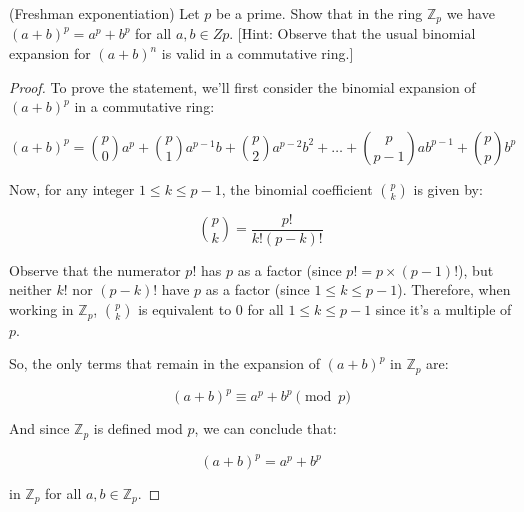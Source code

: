 \documentclass[12pt]{amsart}
\theoremstyle{definition}
\numberwithin{equation}{section}
\theoremstyle{plain}
\newcommand{\Z}{\mathbb{Z}}
\begin{document}
\begin{exercise}{41}
    (Freshman exponentiation) Let $p$ be a prime. Show that in the ring $\Z_p$ we have $(a + b)^p = a^p + b^p$ for all
$a, b \in Zp$. [Hint: Observe that the usual binomial expansion for $(a + b)^n$ is valid in a commutative ring.]
    \begin{proof}
        To prove the statement, we'll first consider the binomial expansion of \( (a + b)^p \) in a commutative ring:

\[
(a + b)^p = \binom{p}{0}a^p + \binom{p}{1}a^{p-1}b + \binom{p}{2}a^{p-2}b^2 + \dots + \binom{p}{p-1}ab^{p-1} + \binom{p}{p}b^p
\]

Now, for any integer \( 1 \leq k \leq p-1 \), the binomial coefficient \( \binom{p}{k} \) is given by:

\[
\binom{p}{k} = \frac{p!}{k!(p-k)!}
\]

Observe that the numerator \( p! \) has \( p \) as a factor (since \( p! = p \times (p-1)! \)), but neither \( k! \) nor \( (p-k)! \) have \( p \) as a factor (since \( 1 \leq k \leq p-1 \)). Therefore, when working in \( \Z_p \), \( \binom{p}{k} \) is equivalent to 0 for all \( 1 \leq k \leq p-1 \) since it's a multiple of \( p \).

So, the only terms that remain in the expansion of \( (a + b)^p \) in \( \Z_p \) are:

\[
(a + b)^p \equiv a^p + b^p \pmod{p}
\]

And since \( \Z_p \) is defined mod \( p \), we can conclude that:

\[
(a + b)^p = a^p + b^p
\]

in \( \Z_p \) for all \( a, b \in \Z_p \).
    \end{proof}
\end{exercise}
\end{document}
